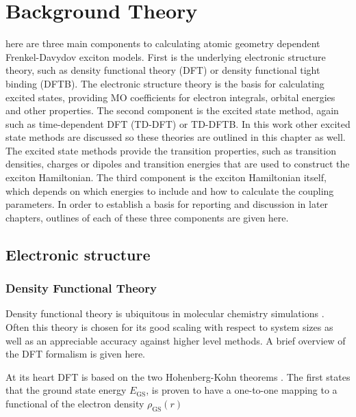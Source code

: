 %
%
\let\textcircled=\pgftextcircled
\chapter{Background Theory}
\label{chap:background_theory}

here are three main components to calculating atomic geometry dependent
Frenkel-Davydov exciton models. First is the underlying electronic structure theory, 
such as density functional theory (DFT) or density functional tight binding (DFTB).
The electronic structure theory is the basis for calculating excited states, providing
MO coefficients for electron integrals, orbital energies and other properties. The 
second component is the excited state method, again such as time-dependent DFT (TD-DFT)
or TD-DFTB. In this work other excited state methods are discussed so these theories 
are outlined in this chapter as well. The excited state methods provide the transition 
properties, such as transition densities, charges or dipoles and transition energies 
that are used to construct the exciton Hamiltonian. The third component is the exciton 
Hamiltonian itself, which depends on which energies to include and how to calculate 
the coupling parameters. In order to establish a basis for reporting and discussion 
in later chapters, outlines of each of these three components are given here.

\section{Electronic structure}
\label{sec:electronic_structure}

\subsection{Density Functional Theory}
\label{subsec:dft}

Density functional theory is ubiquitous in molecular chemistry simulations \cite{Maitra2016}.
Often this theory is chosen for its good scaling with respect to system sizes as 
well as an appreciable accuracy against higher level methods. A brief overview of
the DFT formalism is given here.

At its heart DFT is based on the two Hohenberg-Kohn theorems \cite{Kohn1964}. The
first states that the ground state energy $E_{\text{GS}}$, is proven to have a one-to-one
mapping to a functional of the electron density $\rho_{\text{GS}} \left(r\right)$

